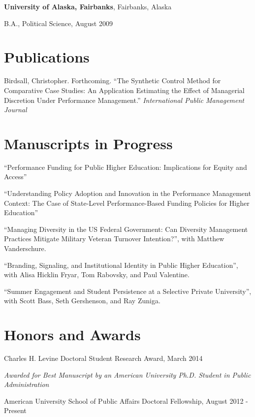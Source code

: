 \documentclass[margin,line]{res}
\newenvironment{list1}{
  \begin{list}{\ding{113}}{%
      \setlength{\itemsep}{0in}
      \setlength{\parsep}{0in} \setlength{\parskip}{0in}
      \setlength{\topsep}{0in} \setlength{\partopsep}{0in} 
      \setlength{\leftmargin}{0.17in}}}{\end{list}}
\begin{document}
\begin{resume}
{\bf University of Alaska, Fairbanks}, Fairbanks, Alaska\\
\vspace*{-.1in}
\begin{list1}
\item[] B.A., Political Science,  August 2009
\end{list1}

\section{\sc Publications}
Birdsall, Christopher. Forthcoming. ``The Synthetic Control Method for Comparative Case Studies: An Application Estimating the Effect of Managerial Discretion Under Performance Management.'' {\em International Public Management Journal}



\section{\sc Manuscripts in Progress}
``Performance Funding for Public Higher Education: Implications for Equity and Access''

``Understanding Policy Adoption and Innovation in the Performance Management Context: The Case of State-Level Performance-Based Funding Policies for Higher Education''


``Managing Diversity in the US Federal Government: Can Diversity Management Practices Mitigate Military Veteran Turnover Intention?'', with Matthew Vanderschure.

``Branding, Signaling, and Institutional Identity in Public Higher Education'', with Alisa Hicklin Fryar, Tom Rabovsky, and Paul Valentine.


``Summer Engagement and Student Persistence at a Selective Private University'', with Scott Bass, Seth Gershenson, and Ray Zuniga.


\section{\sc Honors and Awards} 
Charles H. Levine Doctoral Student Research Award, March 2014
\begin{list1}
\item[]\emph{Awarded for Best Manuscript by an American University Ph.D. Student in Public Administration}
\end{list1}

American University School of Public Affairs Doctoral Fellowship, August 2012 - Present



\end{resume}
\end{document}
